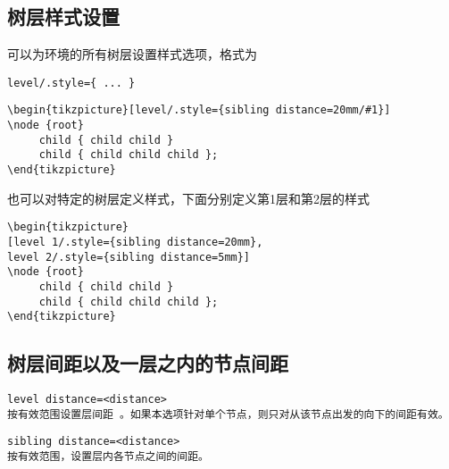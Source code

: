 \documentclass[UTF8]{ctexart}
\begin{document}
\subsection{ 树层样式设置 }

可以为环境的所有树层设置样式选项，格式为
\begin{lstlisting}
level/.style={ ... }
\end{lstlisting}
\begin{lstlisting}
\begin{tikzpicture}[level/.style={sibling distance=20mm/#1}]
\node {root}
     child { child child }
     child { child child child };
\end{tikzpicture}
\end{lstlisting}

也可以对特定的树层定义样式，下面分别定义第1层和第2层的样式
\begin{lstlisting}
\begin{tikzpicture}
[level 1/.style={sibling distance=20mm},
level 2/.style={sibling distance=5mm}]
\node {root}
     child { child child }
     child { child child child };
\end{tikzpicture}
\end{lstlisting}




\subsection{ 树层间距以及一层之内的节点间距 }

\begin{lstlisting}
level distance=<distance>
按有效范围设置层间距 。如果本选项针对单个节点，则只对从该节点出发的向下的间距有效。
\end{lstlisting}
\begin{lstlisting}
sibling distance=<distance>
按有效范围，设置层内各节点之间的间距。
\end{lstlisting}
\end{document}
